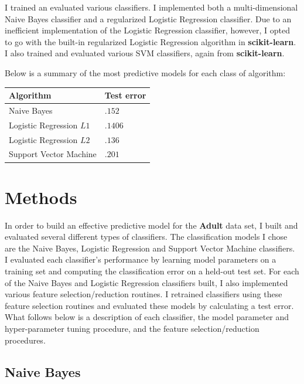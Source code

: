 \documentclass[11pt, oneside]{article}   	%
\begin{document}
I trained an evaluated various classifiers. I implemented both a multi-dimensional Naive Bayes classifier and a regularized Logistic Regression classifier. Due to an inefficient implementation of the Logistic Regression classifier, however, I opted to go with the built-in regularized Logistic Regression algorithm in \textbf{scikit-learn}. I also trained and evaluated various SVM classifiers, again from \textbf{scikit-learn}. 

Below is a summary of the most predictive models for each class of algorithm:

\begin{center}
\begin{tabular}{ l || l  }
    \hline
    \textbf{Algorithm} & \textbf{Test error} \\ \hline
    Naive Bayes & $.152$   \\ \hline
    Logistic Regression $L1$ &  $.1406$     \\ \hline
    Logistic Regression $L2$ &  $.136$    \\ \hline
    Support Vector Machine &  $.201$     \\ \hline
\end{tabular}
\end{center}


\section{Methods}

In order to build an effective predictive model for the \textbf{Adult} data set, I built and evaluated several different types of classifiers. The classification models I chose are the Naive Bayes, Logistic Regression and Support Vector Machine classifiers. I evaluated each classifier's performance by learning model parameters on a training set and computing the classification error on a held-out test set. For each of the Naive Bayes and Logistic Regression classifiers built, I also implemented various feature selection/reduction routines. I retrained classifiers using these feature selection routines and evaluated these models by calculating a test error. What follows below is a description of each classifier, the model parameter and hyper-parameter tuning procedure, and the feature selection/reduction procedures.

\subsection{Naive Bayes}
\end{document}
